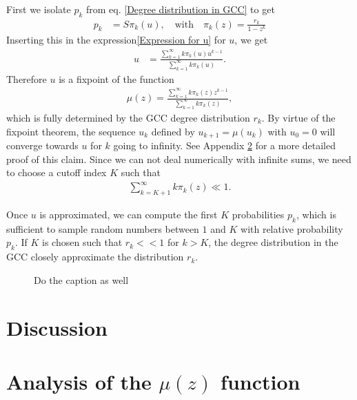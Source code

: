 \documentclass[a4paper]{article}
\begin{document}
First we isolate $p_k$ from eq. \eqref{Degree distribution in GCC} to get
\begin{align}
	p_k &= S \pi_k(u), \quad \text{with} \quad \pi_k(z) = \frac{r_k}{1 - z^k}
\end{align}
Inserting this in the expression\eqref{Expression for u} for $u$, we get
\begin{align}
	u &= \frac{\sum_{k=1}^\infty k \pi_k(u) u^{k-1}}{\sum_{k=1}^\infty k \pi_k(u)}.
\end{align}
Therefore $u$ is a fixpoint of the function
\begin{align}
	\mu(z) = \frac{\sum_{k=1}^\infty k \pi_k(z) z^{k-1}}{\sum_{k=1}^\infty k \pi_k(z)}, \label{Defition of mu}
\end{align}
which is fully determined by the GCC degree distribution $r_k$. By virtue of the fixpoint theorem, the sequence $u_k$ defined by $u_{k+1} = \mu(u_k)$ with $u_0 = 0$ will converge towards $u$ for $k$ going to infinity. See Appendix \ref{Appendix: Fixpoint convergence} for a more detailed proof of this claim. Since we can not deal numerically with infinite sums, we need to choose a cutoff index $K$ such that
\begin{align}
	\sum_{k=K+1}^\infty k \pi_k(z) \ll 1.
\end{align}

Once $u$ is approximated, we can compute the first $K$ probabilities $p_k$, which is sufficient to sample random numbers between $1$ and $K$ with relative probability $p_k$. If $K$ is chosen such that $r_k << 1$ for $k > K$, the degree distribution in the GCC closely approximate the distribution $r_k$.

\begin{figure}
	 \caption{Do the caption as well}
\end{figure}


\section{Discussion}


\appendix
\section{Analysis of the $\mu(z)$ function}
\label{Appendix: Fixpoint convergence}
\end{document}
